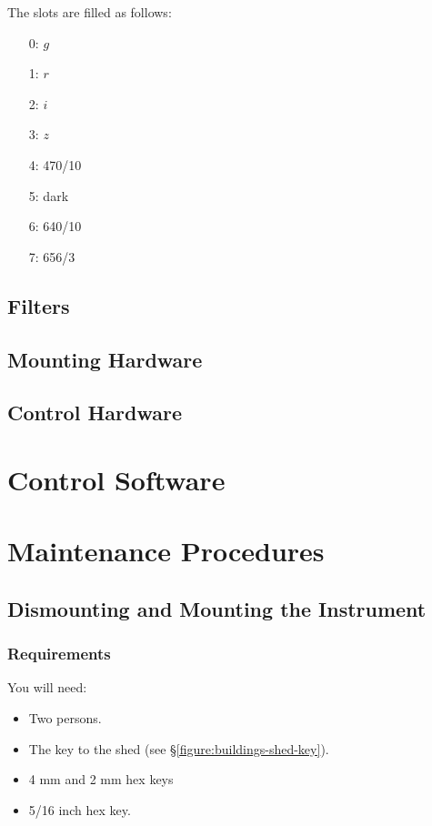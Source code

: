 The slots are filled as follows:
    \begin{enumerate}
        \item[0:] $g$
        \item[1:] $r$
        \item[2:] $i$
        \item[3:] $z$
        \item[4:] 470/10
        \item[5:] dark
        \item[6:] 640/10
        \item[7:] 656/3
    \end{enumerate}
    
\subsection{Filters}


\subsection{Mounting Hardware}

\subsection{Control Hardware}

\section{Control Software}

\section{Maintenance Procedures}

\subsection{Dismounting and Mounting the Instrument}
\label{section:huitzi-dismounting-and-mounting}

\subsubsection{Requirements}

You will need:

\begin{itemize}
    \item Two persons.
    \item The key to the shed (see \S\ref{figure:buildings-shed-key}).
    \item 4 mm and 2 mm hex keys
    \item 5/16 inch hex key.
\end{itemize}

